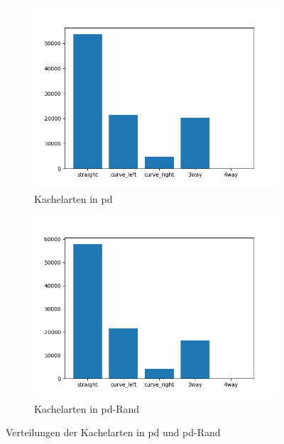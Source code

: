 \begin{figure}[H]
	\centering
	\begin{subfigure}[h]{0.5\textwidth}
		\centering
		\includegraphics[width=\linewidth]{kapitel4/images/plots/tiles-pd.png}
		\caption{Kachelarten in \glqq \acs{pd}\grqq}
		\label{pd-drive-tiles}
	\end{subfigure}%
	\begin{subfigure}[h]{0.5\textwidth}
		\centering
		\includegraphics[width=\linewidth]{kapitel4/images/plots/tiles-pd-rand.png}
		\caption{Kachelarten in \glqq \acs{pd}-Rand\grqq}
		\label{pd-rand-tiles}
	\end{subfigure}
	\caption{Verteilungen der Kachelarten in \glqq \acs{pd}\grqq{} und \glqq \acs{pd}-Rand\grqq}
	\label{pd-tiles}
\end{figure}

